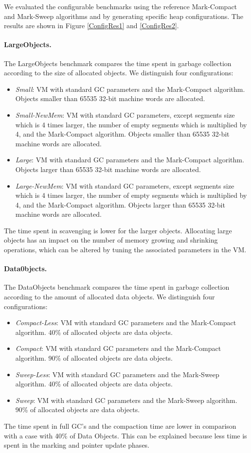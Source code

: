 \documentclass[10pt, sigplan]{acmart}
\begin{document}
We evaluated the configurable benchmarks using the reference Mark-Compact and Mark-Sweep algorithms and by generating specific heap configurations. 
The results are shown in Figure \ref{ConfigRes1} and \ref{ConfigRes2}.

\paragraph{LargeObjects.} The LargeObjects benchmark compares the time spent in garbage collection according to the size of allocated objects. We distinguish four configurations:
\begin{itemize}
\item \emph{Small}: VM with standard GC parameters and the Mark-Compact algorithm. Objects smaller than 65535 32-bit machine words are allocated.
\item \emph{Small-NewMem}: VM with standard GC parameters, except segments size which is 4 times larger, the number of empty segments which is multiplied by 4, and the Mark-Compact algorithm. Objects smaller than 65535 32-bit machine words are allocated.
\item \emph{Large}: VM with standard GC parameters and the Mark-Compact algorithm. Objects larger than 65535 32-bit machine words are allocated.
\item \emph{Large-NewMem}: VM with standard GC parameters, except segments size which is 4 times larger, the number of empty segments which is multiplied by 4, and the Mark-Compact algorithm. Objects larger than 65535 32-bit machine words are allocated.
\end{itemize}
The time spent in scavenging is lower for the larger objects. Allocating large objects has an impact on the number of memory growing and shrinking operations, which can be altered by tuning the associated parameters in the VM. 
\paragraph{Data0bjects.} The DataObjects benchmark compares the time spent in garbage collection according to the amount of allocated data objects.
We distinguish four configurations:
\begin{itemize}
\item \emph{Compact-Less}: VM with standard GC parameters and the Mark-Compact algorithm. 40\% of allocated objects are data objects.
\item \emph{Compact}: VM with standard GC parameters and the Mark-Compact algorithm. 90\% of allocated objects are data objects.
\item \emph{Sweep-Less}: VM with standard GC parameters and the Mark-Sweep algorithm. 40\% of allocated objects are data objects.
\item \emph{Sweep}: VM with standard GC parameters and the Mark-Sweep algorithm. 
90\% of allocated objects are data objects.
\end{itemize}
 The time spent in full GC's and the compaction time are lower in comparison with a case with 40\% of Data Objects. This can be explained because less time is spent in the marking and pointer update phases.
\end{document}
